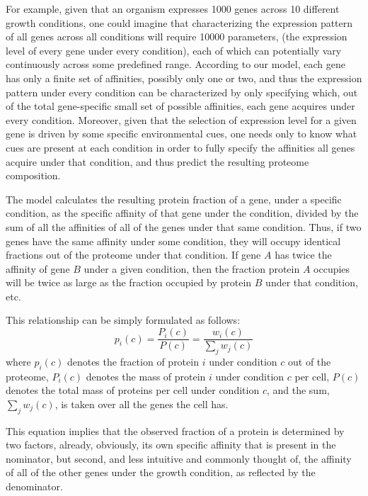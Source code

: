 \documentclass[a4paper]{article}
\begin{document}
For example, given that an organism expresses 1000 genes across 10 different growth conditions, one could imagine that characterizing the expression pattern of all genes across all conditions will require 10000 parameters, (the expression level of every gene under every condition), each of which can potentially vary continuously across some predefined range.
According to our model, each gene has only a finite set of affinities, possibly only one or two, and thus the expression pattern under every condition can be characterized by only specifying which, out of the total gene-specific small set of possible affinities, each gene acquires under every condition.
Moreover, given that the selection of expression level for a given gene is driven by some specific environmental cues, one needs only to know what cues are present at each condition in order to fully specify the affinities all genes acquire under that condition, and thus predict the resulting proteome composition.


The model calculates the resulting protein fraction of a gene, under a specific condition, as the specific affinity of that gene under the condition, divided by the sum of all the affinities of all of the genes under that same condition.
Thus, if two genes have the same affinity under some condition, they will occupy identical fractions out of the proteome under that condition.
If gene $A$ has twice the affinity of gene $B$ under a given condition, then the fraction protein  $A$ occupies will be twice as large as the fraction occupied by protein $B$ under that condition, etc.

This relationship can be simply formulated as follows:
\begin{equation}
  \label{eq:concentration-ratio}
  p_i(c)=\frac{P_i(c)}{P(c)}=\frac{w_i(c)}{\sum_jw_j(c)}
\end{equation}
where $p_i(c)$ denotes the fraction of protein $i$ under condition $c$ out of the proteome, $P_i(c)$ denotes the mass of protein $i$ under condition $c$ per cell, $P(c)$ denotes the total mass of proteins per cell under condition $c$, and the sum, $\sum_jw_j(c)$, is taken over all the genes the cell has.

This equation implies that the observed fraction of a protein is determined by two factors, already, obviously, its own specific affinity that is present in the nominator, but second, and less intuitive and commonly thought of, the affinity of all of the other genes under the growth condition, as reflected by the denominator.
\end{document}

